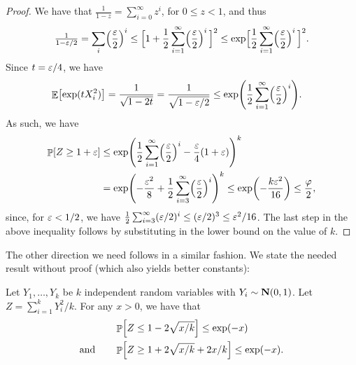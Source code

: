 \begin{proof}
    We have that $\frac{1}{1-z} = \sum_{i=0}^\infty z^i$, for
    $0 \leq z < 1$, and thus
    \begin{equation*}
        \tfrac{1}{{1-\eps/2}} %
        =%
        \sum_i \pth{\frac{\eps}{2}}^i%
        \leq%
        \Bigl[{1 + \frac{1}{2}\sum_{i=1}^\infty
           \pth{\frac{\eps}{2}}^{i}}\,\Bigr]^2%
        \leq%
        \exp\Bigl[{\frac{1}{2}\sum_{i=1}^\infty
           \pth{\frac{\eps}{2}}^{i}}\,\Bigr]^2.
    \end{equation*}
    Since $t={\varepsilon}/4$, we have
    \begin{align*}
      \Ex{\exp( tX_i^2) }%
      &=%
        \frac{1}{\sqrt{1-2t}}%
        =%
        \frac{1}{\sqrt{1-\eps/2}}
      \leq
      \exp\pth{\frac{1}{2}\sum_{i=1}^\infty
      \pth{\frac{\eps}{2}}^{i}}.%
    \end{align*}
    As such, we have
    \begin{align*}
        \Prob{Z \geq 1+\eps}%
        &\leq%
        \exp\pth{\frac{1}{2}\sum_{i=1}^\infty
           \pth{\frac{\eps}{2}}^{i}
           -
           \frac{\eps}{4} \pth{1+\eps} }^k
        \\&
        =%
        \exp\pth{
           -\frac{\eps^2}{8} + 
           \frac{1}{2}\sum_{i=3}^\infty
           \pth{\frac{\eps}{2}}^{i}
        }^k
        \leq%
        \exp\pth{-\frac{k \eps^2}{16}}
        \leq %
        \frac{\BadProb}{2},
    \end{align*}
    since, for ${\varepsilon} < 1/2$, we have
    $\frac{1}{2}\sum_{i=3}^\infty ({\varepsilon}/ 2)^{i}\leq ({\varepsilon}/2)^3 \leq
    {{\varepsilon}^2}/{16}$. The last step in the above inequality follows by
    substituting in the lower bound on the value of $k$.
\end{proof}

The other direction we need follows in a similar fashion. We state the
needed result without proof \cite[Lemma 1]{lm-aeqfm-00} (which also
yields better constants):

\begin{lemma}
    Let $Y_1, \ldots, Y_k$ be $k$ independent random variables with
    $Y_i \sim \NormalY{0}{1}$. Let $Z = \sum_{i=1}^k Y_i^2/k$. For any
    $x >0$, we have that
    \begin{align*}
        &\Prob{Z  \leq 1 -2 \sqrt{ x/k}} \leq \exp(-x)%
        \\
        \text{and}\qquad&
        \Prob{Z  \geq 1 + 2 \sqrt{ x/k} + 2x/k} \leq \exp(-x).%
    \end{align*}   
\end{lemma}

